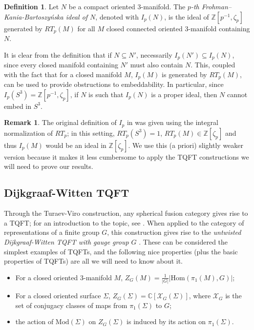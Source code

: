 \documentclass[12pt]{amsart}
\theoremstyle{definition}
\newtheorem{dfn}[thm]{Definition}
\newtheorem{rem}[thm]{Remark}
\newcommand{\C}{\mathbb{C}}
\newcommand{\Z}{\mathbb{Z}}
\begin{document}
\begin{dfn}\label{def:FKBideals}\cite{FKB}
	Let $N$ be a compact oriented $3$-manifold. The \emph{$p$-th Frohman--Kania-Bartoszy\'nska ideal of $N$}, denoted with $I_p(N)$, is the ideal of $\Z[p^{-1},\zeta_p]$ generated by $RT_p(M)$ for all $M$ closed connected oriented $3$-manifold containing $N$.
\end{dfn}

It is clear from the definition that if $N\subseteq N'$, necessarily $I_p(N')\subseteq I_p(N)$, since every closed manifold containing $N'$ must also contain $N$. This, coupled with the fact that for a closed manifold $M$, $I_p(M)$ is generated by $RT_p(M)$, can be used to provide obstructions to embeddability. In particular, since $I_p(S^3)=\Z[p^{-1},\zeta_p]$, if $N$ is such that $I_p(N)$ is a proper ideal, then $N$ cannot embed in $S^3$.

\begin{rem}\label{rem:normalization}
	The original definition of $I_p$ in \cite{FKB} was given using the integral normalization of $RT_p$; in this setting, $RT_p(S^3)=1$, $RT_p(M)\in \Z\left[\zeta_p\right]$ and thus $I_p(M)$ would be an ideal in $\Z[\zeta_p]$. We use this (a priori) slightly weaker version because it makes it less cumbersome to apply the TQFT constructions we will need to prove our results.
\end{rem}




\subsection{Dijkgraaf-Witten TQFT}
\label{sec:DW-TQFT}
Through the Turaev-Viro construction, any spherical fusion category gives rise to a TQFT; for an introduction to the topic, see \cite{Turaev}. When applied to the category of representations of a finite group $G$, this construction gives rise to the \emph{untwisted Dijkgraaf-Witten TQFT with gauge group $G$} \cite{DW90} \cite{FQ93}. These can be considered the simplest examples of TQFTs, and the following nice properties (plus the basic properties of TQFTs) are all we will need to know about it.

\begin{itemize}
	\item For a closed oriented $3$-manifold $M$, $Z_G(M)=\frac{1}{\lvert G\rvert}\lvert \mathrm{Hom}(\pi_1(M),G)\rvert$;
	\item For a closed oriented surface $\Sigma$, $Z_G(\Sigma)=\C[\mathcal{X}_G(\Sigma)]$, where $\mathcal{X}_G$ is the set of conjugacy classes of maps from $\pi_1(\Sigma)$ to $G$;
	\item the action of $\mathrm{Mod}(\Sigma)$ on $Z_G(\Sigma)$ is induced by its action on $\pi_1(\Sigma)$.
\end{itemize}
\end{document}

